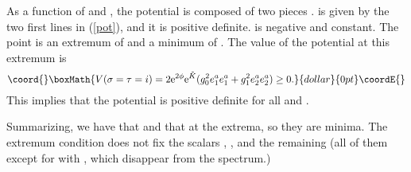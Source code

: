 \documentclass[a4paper,12pt]{article}
\begin{document}
As a function of \myHighlight{$\sigma$}\coordHE{} and \myHighlight{$\tau$}\coordHE{}, the potential \coordHE{} is
composed of two pieces \coordHE{}. \coordHE{} is
given by  the two first lines in (\ref{pot}), and it  is positive
definite. \coordHE{} is negative and  constant. The point \coordHE{}
is an extremum of \coordHE{} and a minimum of \coordHE{}.  The value of the
potential at this extremum is
$$\coord{}\boxMath{V( \sigma=\tau=i)=2\mathrm{e}^{2\phi}\mathrm{e}^{\tilde
K}(g_0^2e_1^ae_1^a+g_1^2e_2^ae_2^a)\geq 0.}{dollar}{0pt}\coordE{}$$ This implies that the
potential is positive definite for all \myHighlight{$\sigma$}\coordHE{} and \myHighlight{$\tau$}\coordHE{}.

Summarizing,  we have that \coordHE{} and that \coordHE{} at the
extrema, so they are minima. The extremum condition does not fix
the scalars \myHighlight{$\phi$}\coordHE{}, \myHighlight{$\rho$}\coordHE{}, \coordHE{} and the remaining \coordHE{} (all
of them  except for \coordHE{} with \coordHE{}, which disappear from the
spectrum.)
\end{document}
